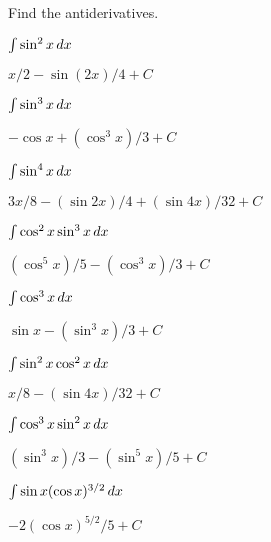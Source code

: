 \begin{exercises}

\noindent Find the antiderivatives.

\twocol

\begin{exercise} $\int \sin^2 x\, d x$
\begin{answer} $x/2-\sin(2x)/4+C$
\end{answer}\end{exercise}

\begin{exercise} $\int \sin^3 x\, d x$
\begin{answer} $-\cos x+(\cos^3x)/3+C$
\end{answer}\end{exercise}

\begin{exercise} $\int \sin^4 x\, d x$
\begin{answer} $3x/8-(\sin 2x)/4+(\sin 4x)/32+C$
\end{answer}\end{exercise}

\begin{exercise} $\int \cos^2 x\sin^3 x\, d x$
\begin{answer} $(\cos^5 x)/5-(\cos^3x)/3+C$
\end{answer}\end{exercise}

\begin{exercise} $\int \cos^3 x\, d x$
\begin{answer} $\sin x-(\sin^3x)/3+C$
\end{answer}\end{exercise}

\begin{exercise} $\int \sin^2 x\cos^2 x\, d x$
\begin{answer} $x/8-(\sin 4x)/32+C$
\end{answer}\end{exercise}

\begin{exercise} $\int \cos^3 x \sin^2 x\, d x$
\begin{answer} $(\sin^3x)/3-(\sin^5x)/5+C$
\end{answer}\end{exercise}

\begin{exercise} $\int \sin x (\cos x)^{3/2}\, d x$
\begin{answer} $-2(\cos x)^{5/2}/5+C$
\end{answer}\end{exercise}


\end{exercises}
